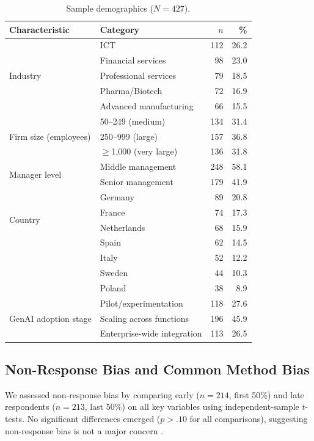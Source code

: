 \documentclass[12pt, a4paper]{article}
\begin{document}
\begin{table}[H]
\centering
\caption{Sample demographics ($N = 427$).}
\label{tab:sample}
\small
\begin{tabularx}{\textwidth}{lXrr}
\toprule
\textbf{Characteristic} & \textbf{Category} & \textbf{$n$} & \textbf{\%} \\
\midrule
\multirow{5}{*}{Industry} & ICT & 112 & 26.2 \\
 & Financial services & 98 & 23.0 \\
 & Professional services & 79 & 18.5 \\
 & Pharma/Biotech & 72 & 16.9 \\
 & Advanced manufacturing & 66 & 15.5 \\
\midrule
\multirow{3}{*}{Firm size (employees)} & 50--249 (medium) & 134 & 31.4 \\
 & 250--999 (large) & 157 & 36.8 \\
 & $\geq$1,000 (very large) & 136 & 31.8 \\
\midrule
\multirow{2}{*}{Manager level} & Middle management & 248 & 58.1 \\
 & Senior management & 179 & 41.9 \\
\midrule
\multirow{4}{*}{Country} & Germany & 89 & 20.8 \\
 & France & 74 & 17.3 \\
 & Netherlands & 68 & 15.9 \\
 & Spain & 62 & 14.5 \\
 & Italy & 52 & 12.2 \\
 & Sweden & 44 & 10.3 \\
 & Poland & 38 & 8.9 \\
\midrule
\multirow{3}{*}{GenAI adoption stage} & Pilot/experimentation & 118 & 27.6 \\
 & Scaling across functions & 196 & 45.9 \\
 & Enterprise-wide integration & 113 & 26.5 \\
\bottomrule
\end{tabularx}
\end{table}

\subsection{Non-Response Bias and Common Method Bias}

We assessed non-response bias by comparing early ($n = 214$, first 50\%) and late respondents ($n = 213$, last 50\%) on all key variables using independent-sample $t$-tests. No significant differences emerged ($p > .10$ for all comparisons), suggesting non-response bias is not a major concern \citep{Armstrong1977}.
\end{document}
